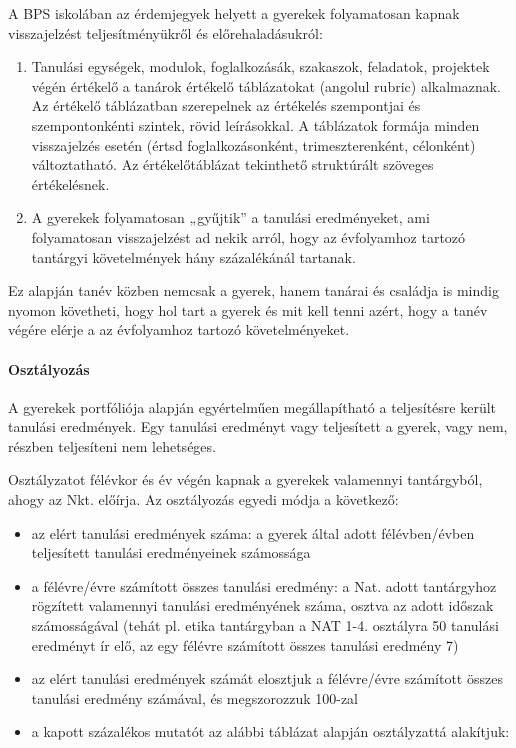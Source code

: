 \documentclass{article}
\providecommand{\tightlist}{%
  \setlength{\itemsep}{0pt}\setlength{\parskip}{0pt}}
\begin{document}
A BPS iskolában az érdemjegyek helyett a gyerekek folyamatosan kapnak
visszajelzést teljesítményükről és előrehaladásukról:

\begin{enumerate}
\def\labelenumi{\arabic{enumi}.}
\item
  Tanulási egységek, modulok, foglalkozásák, szakaszok, feladatok,
  projektek végén értékelő a tanárok értékelő táblázatokat (angolul
  rubric) alkalmaznak. Az értékelő táblázatban szerepelnek az értékelés
  szempontjai és szempontonkénti szintek, rövid leírásokkal. A
  táblázatok formája minden visszajelzés esetén (értsd
  foglalkozásonként, trimeszterenként, célonként) változtatható. Az
  értékelőtáblázat tekinthető struktúrált szöveges értékelésnek.
\item
  A gyerekek folyamatosan „gyűjtik'' a tanulási eredményeket, ami
  folyamatosan visszajelzést ad nekik arról, hogy az évfolyamhoz tartozó
  tantárgyi követelmények hány százalékánál tartanak.
\end{enumerate}

Ez alapján tanév közben nemcsak a gyerek, hanem tanárai és családja is
mindig nyomon követheti, hogy hol tart a gyerek és mit kell tenni azért,
hogy a tanév végére elérje a az évfolyamhoz tartozó követelményeket.

\hypertarget{osztalyozas}{%
\paragraph{Osztályozás}\label{osztalyozas}}

A gyerekek portfóliója alapján egyértelműen megállapítható a
teljesítésre került tanulási eredmények. Egy tanulási eredményt vagy
teljesített a gyerek, vagy nem, részben teljesíteni nem lehetséges.

Osztályzatot félévkor és év végén kapnak a gyerekek valamennyi
tantárgyból, ahogy az Nkt. előírja. Az osztályozás egyedi módja a
következő:

\begin{itemize}
\tightlist
\item
  az elért tanulási eredmények száma: a gyerek által adott
  félévben/évben teljesített tanulási eredményeinek számossága
\item
  a félévre/évre számított összes tanulási eredmény: a Nat. adott
  tantárgyhoz rögzített valamennyi tanulási eredményének száma, osztva
  az adott időszak számosságával (tehát pl. etika tantárgyban a NAT 1-4.
  osztályra 50 tanulási eredményt ír elő, az egy félévre számított
  összes tanulási eredmény 7)
\item
  az elért tanulási eredmények számát elosztjuk a félévre/évre számított
  összes tanulási eredmény számával, és megszorozzuk 100-zal
\item
  a kapott százalékos mutatót az alábbi táblázat alapján osztályzattá
  alakítjuk:
\end{itemize}
\end{document}
